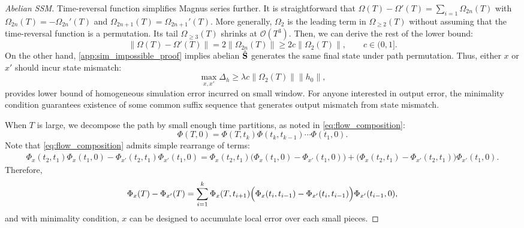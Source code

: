 \begin{proof}[Abelian SSM]
    Time-reversal function simplifies Magnus series further.
    It is straightforward that $\Omega(T) - \Omega'(T) = \sum_{i=1} \Omega_{2n}(T)$ with $\Omega_{2n}(T) = -\Omega_{2n}'(T)$ and $\Omega_{2n+1}(T) = \Omega_{2n+1}'(T)$.
    More generally,
    $\Omega_2$ is the leading term in $\Omega_{\ge 2}(T)$
    without assuming that the time-reversal function is a permutation.
    Its tail $\Omega_{\ge 3}(T)$ shrinks at $\mathcal{O}(T^3)$.
    Then, we can derive the rest of the lower bound:
    \begin{equation}
    \label{app:eq_OmegaError_2nd}
        \| \Omega(T) - \Omega'(T) \|
        =
        2\|\Omega_{2n}(T)\|
        \ge 2c\|\Omega_2(T)\|, \qquad c \in (0,1].
    \end{equation}
    On the other hand, \cref{app:sim_impossible_proof} implies abelian $\hat{\mathbf{S}}$ generates the same final state under path permutation.
    Thus, either $x$ or $x'$ should incur state mismatch:
    \begin{equation*}
        \max_{x,x'} \Delta_h
        \ge
        \lambda c \|\Omega_2(T)\|\|h_0\|,
    \end{equation*}
    provides lower bound of homogeneous simulation error incurred on small window.
    For anyone interested in output error,
    the minimality condition guarantees existence of some common suffix sequence
    that generates output mismatch from state mismatch.
    
    When $T$ is large, we decompose the path by small enough time partitions, as noted in \cref{eq:flow_composition}:
    \begin{equation}
        \Phi(T,0) = \Phi(T,t_k)\Phi(t_k,t_{k-1})\cdots\Phi(t_1,0).
    \end{equation}
    Note that \cref{eq:flow_composition} admits simple rearrange of terms:
    \begin{align*}
        \Phi_x(t_2,t_1)\Phi_x(t_1,0) - \Phi_{x'}(t_2,t_1)\Phi_{x'}(t_1,0)
        =
        \Phi_x(t_2,t_1)\bigl(\Phi_x(t_1,0) - \Phi_{x'}(t_1,0)\bigr)
        +
        \bigl(\Phi_x(t_2,t_1) - \Phi_{x'}(t_2,t_1)\bigr)\Phi_{x'}(t_1,0).
    \end{align*}
    Therefore,
    \begin{equation}
        \Phi_x(T) - \Phi_{x'}(T) = \sum_{i=1}^k \Phi_x(T, t_{i+1})
        \Bigl(
        \Phi_x(t_i, t_{i-1}) - \Phi_{x'}(t_i, t_{i-1})
        \Bigr)
        \Phi_{x'}(t_{i-1},0),
    \end{equation}
    and with minimality condition, $x$ can be designed to accumulate local error over each small pieces.
\end{proof}
